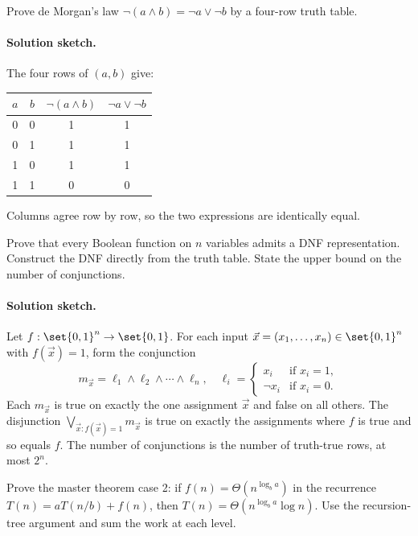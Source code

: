 \begin{exercise}
Prove de Morgan's law $\lnot(a \land b) = \lnot a \lor \lnot b$ by
a four-row truth table.
\end{exercise}

\paragraph{Solution sketch.}
The four rows of $(a, b)$ give:
\begin{center}
\begin{tabular}{cccc}
$a$ & $b$ & $\lnot(a \land b)$ & $\lnot a \lor \lnot b$ \\
\hline
0 & 0 & 1 & 1 \\
0 & 1 & 1 & 1 \\
1 & 0 & 1 & 1 \\
1 & 1 & 0 & 0 \\
\end{tabular}
\end{center}
Columns agree row by row, so the two expressions are
identically equal.

\begin{exercise}
Prove that every Boolean function on $n$ variables admits a DNF
representation. Construct the DNF directly from the truth table.
State the upper bound on the number of conjunctions.
\end{exercise}

\paragraph{Solution sketch.}
Let $f: \set{0, 1}^{n} \to \set{0, 1}$. For each input $\vec{x} =
(x_{1}, \ldots, x_{n}) \in \set{0, 1}^{n}$ with $f(\vec{x}) = 1$,
form the conjunction
\[
m_{\vec{x}} = \ell_{1} \land \ell_{2} \land \cdots \land \ell_{n},
\quad
\ell_{i} = \begin{cases} x_{i} & \text{if } x_{i} = 1, \\
                          \lnot x_{i} & \text{if } x_{i} = 0.
            \end{cases}
\]
Each $m_{\vec{x}}$ is true on exactly the one assignment $\vec{x}$
and false on all others. The disjunction $\bigvee_{\vec{x} :
f(\vec{x}) = 1} m_{\vec{x}}$ is true on exactly the assignments
where $f$ is true and so equals $f$. The number of conjunctions is
the number of truth-true rows, at most $2^{n}$.

\begin{exercise}
Prove the master theorem case 2: if $f(n) = \Theta(n^{\log_{b} a})$
in the recurrence $T(n) = a T(n/b) + f(n)$, then $T(n) =
\Theta(n^{\log_{b} a} \log n)$. Use the recursion-tree argument and
sum the work at each level.
\end{exercise}

